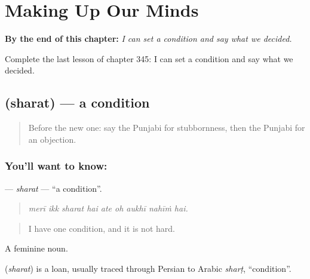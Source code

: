 
\chapter{Making Up Our Minds}
\label{ch:pa-a2-making-up-our-minds}

\begin{chapteropening}
\textbf{By the end of this chapter:} \emph{I can set a condition and say what we decided.}

Complete the last lesson of chapter 345: I can set a condition and say what we decided.
\end{chapteropening}

\section[\texorpdfstring{\pa{ਸ਼ਰਤ} (sharat)}{ਸ਼ਰਤ (sharat)}]{ (sharat) — a condition}

\label{lesson:PA-C345-sharat}



\begin{quote}
Before the new one: say the Punjabi for stubbornness, then the Punjabi for an objection.
\end{quote}

\subsection*{You'll want to know: }
\textbf{} — \emph{sharat} — \textquotedblleft{}a condition\textquotedblright{}.

\begin{quote}
        
\end{quote}

\begin{quote}
\emph{merī ikk sharat hai ate oh aukhī nahīṁ hai.}
\end{quote}

\begin{quote}
I have one condition, and it is not hard.
\end{quote}

A feminine noun.

\begin{cousinweb}
\textbf{} (\emph{sharat}) is a loan, usually traced through Persian to Arabic \emph{sharṭ}, \textquotedblleft{}condition\textquotedblright{}.
\end{cousinweb}

